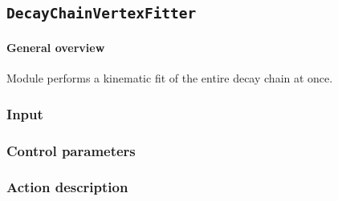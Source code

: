 \newpage
\subsection{\tt DecayChainVertexFitter}
\label{sec:modules:decayChainVertexFitter}
\secwriter{}


\paragraph{General overview}

Module performs a kinematic fit of the entire decay chain at once.

\subsubsection{Input}
\subsubsection{Control parameters}
\subsubsection{Action description}


